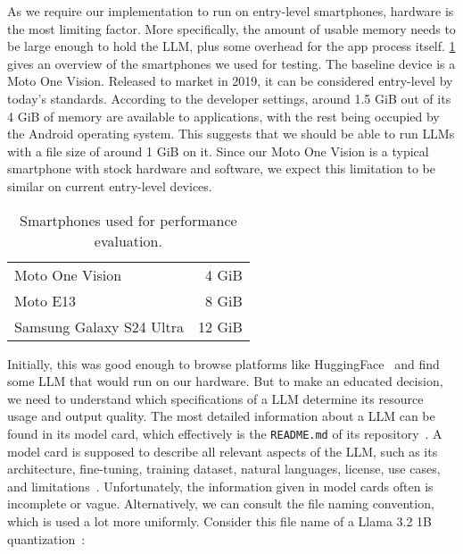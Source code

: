 As we require our implementation to run on entry-level smartphones, hardware is the most limiting factor. More specifically, the amount of usable memory needs to be large enough to hold the \gls{LLM}, plus some overhead for the app process itself. \cref{tab:smartphones} gives an overview of the smartphones we used for testing. The baseline device is a Moto One Vision. Released to market in 2019, it can be considered entry-level by today's standards. According to the developer settings, around 1.5 GiB out of its 4 GiB of memory are available to applications, with the rest being occupied by the Android operating system. This suggests that we should be able to run \glspl{LLM} with a file size of around 1 GiB on it. Since our Moto One Vision is a typical smartphone with stock hardware and software, we expect this limitation to be similar on current entry-level devices.

\begin{table}
	\centering
	\begin{tabular}{@{} lr @{}} %
		\toprule
		\tableheadline{Device} & \tableheadline{Memory} \\
		\midrule
		Moto One Vision          &  4 GiB \\
		Moto E13                 &  8 GiB \\
		Samsung Galaxy S24 Ultra & 12 GiB \\
		\bottomrule
	\end{tabular}
	\caption[Smartphones]{Smartphones used for performance evaluation.}
	\label{tab:smartphones}
\end{table}

Initially, this was good enough to browse platforms like HuggingFace~\cite{huggingfaceModelsHuggingFace2025} and find some \gls{LLM} that would run on our hardware. But to make an educated decision, we need to understand which specifications of a \gls{LLM} determine its resource usage and output quality. The most detailed information about a \gls{LLM} can be found in its model card, which effectively is the \lstinline|README.md| of its repository~\cite{mitchellModelCardsModel2019,huggingfaceModelCards}. A model card is supposed to describe all relevant aspects of the \gls{LLM}, such as its architecture, fine-tuning, training dataset, natural languages, license, use cases, and limitations~\cite{mitchellModelCardsModel2019,huggingfaceModelCards}. Unfortunately, the information given in model cards often is incomplete or vague. Alternatively, we can consult the file naming convention, which is used a lot more uniformly. Consider this file name of a Llama 3.2 1B quantization~\cite{huggingquantsHuggingquantsLlama321BInstructQ4_K_MGGUFHugging2024}:

